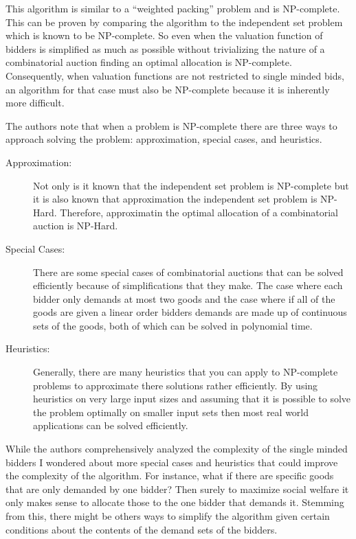\documentclass[10pt,onecolumn,letterpaper]{article}
\theoremstyle{definition}
\begin{document}
This algorithm is similar to a ``weighted packing'' problem and is NP-complete. This can be proven by comparing the algorithm to the independent set problem which is known to be NP-complete. So even when the valuation function of bidders is simplified as much as possible without trivializing the nature of a combinatorial auction finding an optimal allocation is NP-complete. Consequently, when valuation functions are not restricted to single minded bids, an algorithm for that case must also be NP-complete because it is inherently more difficult. 

The authors note that when a problem is NP-complete there are three ways to approach solving the problem: approximation, special cases, and heuristics. 

\begin{description}
  \item [Approximation:] Not only is it known that the independent set problem is NP-complete but it is also known that approximation the independent set problem is NP-Hard. Therefore, approximatin the optimal allocation of a combinatorial auction is NP-Hard.

  \item [Special Cases:] There are some special cases of combinatorial auctions that can be solved efficiently because of simplifications that they make. The case where each bidder only demands at most two goods and the case where if all of the goods are given a linear order bidders demands are made up of continuous sets of the goods, both of which can be solved in polynomial time.

  \item [Heuristics:] Generally, there are many heuristics that you can apply to NP-complete problems to approximate there solutions rather efficiently. By using heuristics on very large input sizes and assuming that it is possible to solve the problem optimally on smaller input sets then most real world applications can be solved efficiently. 

\end{description}

While the authors comprehensively analyzed the complexity of the single minded bidders I wondered about more special cases and heuristics that could improve the complexity of the algorithm. For instance, what if there are specific goods that are only demanded by one bidder? Then surely to maximize social welfare it only makes sense to allocate those to the one bidder that demands it. Stemming from this, there might be others ways to simplify the algorithm given certain conditions about the contents of the demand sets of the bidders.
\end{document}
